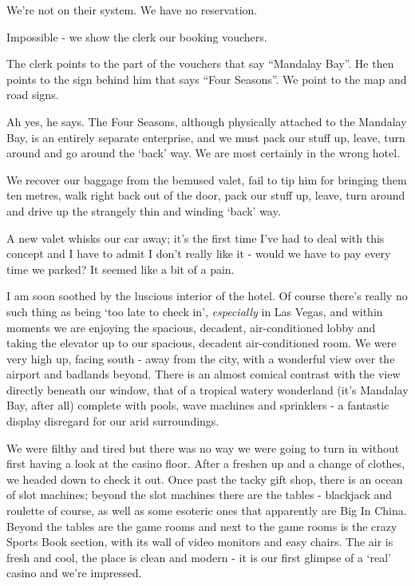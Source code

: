 \documentclass[a5paper,titlepage,11pt]{book}
\begin{document}
We're not on their system.  We have no reservation.

Impossible - we show the clerk our booking vouchers.

The clerk points to the part of the vouchers that say ``Mandalay Bay''.  He then points to the sign behind him that says ``Four Seasons''.  We point to the map and road signs.

Ah yes, he says.  The Four Seasons, although physically attached to the Mandalay Bay, is an entirely separate enterprise, and we must pack our stuff up, leave, turn around and go around the `back' way.  We are most certainly in the wrong hotel.

We recover our baggage from the bemused valet, fail to tip him for bringing them ten metres, walk right back out of the door, pack our stuff up, leave, turn around and drive up the strangely thin and winding `back' way.

A new valet whisks our car away; it's the first time I've had to deal with this concept and I have to admit I don't really like it - would we have to pay every time we parked?  It seemed like a bit of a pain.

I am soon soothed by the luscious interior of the hotel.  Of course there's really no such thing as being `too late to check in', \emph{especially} in Las Vegas, and within moments we are enjoying the spacious, decadent, air-conditioned lobby and taking the elevator up to our spacious, decadent air-conditioned room.  We were very high up, facing south - away from the city, with a wonderful view over the airport and badlands beyond.  There is an almost comical contrast with the view directly beneath our window, that of a tropical watery wonderland (it's Mandalay Bay, after all) complete with pools, wave machines and sprinklers - a fantastic display disregard for our arid surroundings.

We were filthy and tired but there was no way we were going to turn in without first having a look at the casino floor.  After a freshen up and a change of clothes, we headed down to check it out.  Once past the tacky gift shop, there is an ocean of slot machines; beyond the slot machines there are the tables - blackjack and roulette of course, as well as some esoteric ones that apparently are Big In China.  Beyond the tables are the game rooms and next to the game rooms is the crazy Sports Book section, with its wall of video monitors and easy chairs.  The air is fresh and cool, the place is clean and modern - it is our first glimpse of a `real' casino and we're impressed.
\end{document}
